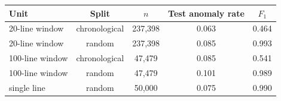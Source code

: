 \begin{tabular}{@{}lcccc@{}}
\toprule
Unit & Split & $n$ & Test anomaly rate & $F_1$ \\
\midrule
20-line window & chronological & 237,398 & 0.063 & 0.464 \\
20-line window & random & 237,398 & 0.085 & 0.993 \\
100-line window & chronological & 47,479 & 0.085 & 0.541 \\
100-line window & random & 47,479 & 0.101 & 0.989 \\
single line & random & 50,000 & 0.075 & 0.990 \\
\bottomrule
\end{tabular}
